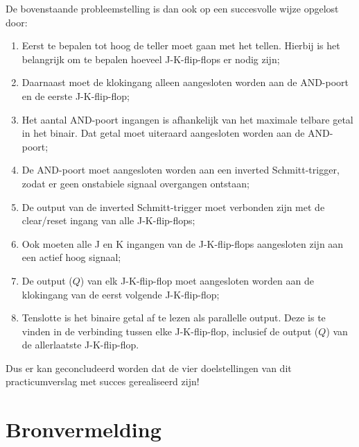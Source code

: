 \documentclass[12pt]{article}
\begin{document}
De bovenstaande probleemstelling is dan ook op een succesvolle wijze opgelost door:
\begin{enumerate}
    \item Eerst te bepalen tot hoog de teller moet gaan met het tellen. Hierbij is het belangrijk om te bepalen hoeveel J-K-flip-flops er nodig zijn;
    \item Daarnaast moet de klokingang alleen aangesloten worden aan de AND-poort en de eerste J-K-flip-flop;
    \item Het aantal AND-poort ingangen is afhankelijk van het maximale telbare getal in het binair. Dat getal moet uiteraard aangesloten worden aan de AND-poort;
    \item De AND-poort moet aangesloten worden aan een inverted Schmitt-trigger, zodat er geen onstabiele signaal overgangen ontstaan;
    \item De output van de inverted Schmitt-trigger moet verbonden zijn met de clear/reset ingang van alle J-K-flip-flops;
    \item Ook moeten alle J en K ingangen van de J-K-flip-flops aangesloten zijn aan een actief hoog signaal;
    \item De output ($Q$) van elk J-K-flip-flop moet aangesloten worden aan de klokingang van de eerst volgende J-K-flip-flop;
    \item Tenslotte is het binaire getal af te lezen als parallelle output. Deze is te vinden in de verbinding tussen elke J-K-flip-flop, inclusief de output ($Q$) van de allerlaatste J-K-flip-flop.
\end{enumerate}
Dus er kan geconcludeerd worden dat de vier doelstellingen van dit practicumverslag met succes gerealiseerd zijn!
\pagebreak






\nocite{*}
\section{Bronvermelding}




\pagebreak
\end{document}
